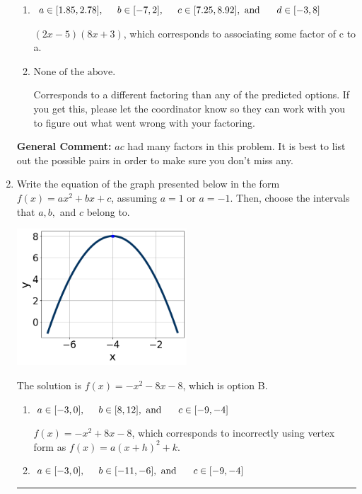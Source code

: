\documentclass{extbook}[14pt]
\newcommand{\litem}[1]{\item #1

\rule{\textwidth}{0.4pt}}
\begin{document}
\begin{enumerate}
{\begin{enumerate}[label=\Alph*.]
 $(x -20)(x + 12)$, which corresponds to factoring $x^{2} -8 x -240$.
\item \( a \in [1.85, 2.78], \hspace*{5mm} b \in [-7, 2], \hspace*{5mm} c \in [7.25, 8.92], \text{ and } \hspace*{5mm} d \in [-3, 8] \)

 $(2x -5)(8x + 3)$, which corresponds to associating some factor of c to a.
\item \( \text{None of the above.} \)

 Corresponds to a different factoring than any of the predicted options. If you get this, please let the coordinator know so they can work with you to figure out what went wrong with your factoring.
\end{enumerate}

\textbf{General Comment:} $ac$ had many factors in this problem. It is best to list out the possible pairs in order to make sure you don't miss any.
}
\litem{
Write the equation of the graph presented below in the form $f(x)=ax^2+bx+c$, assuming  $a=1$ or $a=-1$. Then, choose the intervals that $a, b,$ and $c$ belong to.

\begin{center}
    \includegraphics[width=0.5\textwidth]{../Figures/quadraticGraphToEquationCopyB.png}
\end{center}


The solution is \( f(x) = -x^{2} -8 x -8 \), which is option B.\begin{enumerate}[label=\Alph*.]
\item \( a \in [-3, 0], \hspace*{5mm} b \in [8, 12], \text{ and } \hspace*{5mm} c \in [-9, -4] \)

$f(x)=-x^{2} +8 x -8$, which corresponds to incorrectly using vertex form as $f(x) = a(x+h)^2+k$.
\item \( a \in [-3, 0], \hspace*{5mm} b \in [-11, -6], \text{ and } \hspace*{5mm} c \in [-9, -4] \)


\end{enumerate}}
\end{enumerate}
\end{document}
